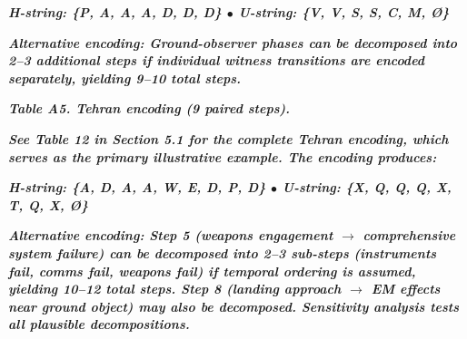\documentclass[11pt,letterpaper]{article}
\begin{document}
\begin{table}[H]
\centering
\small
{}
\end{table}


\textbf{\textit{H-string: \{P, A, A, A, D, D, D\}  $\bullet$  U-string: \{V, V, S, S, C, M, {\O}\}}}


\textbf{\textit{Alternative encoding: Ground-observer phases can be decomposed into 2--3 additional steps if individual witness transitions are encoded separately, yielding 9--10 total steps.}}


\textbf{\textit{Table A5. Tehran encoding (9 paired steps).}}


\textbf{\textit{See Table 12 in Section 5.1 for the complete Tehran encoding, which serves as the primary illustrative example. The encoding produces:}}


\textbf{\textit{H-string: \{A, D, A, A, W, E, D, P, D\}  $\bullet$  U-string: \{X, Q, Q, Q, X, T, Q, X, {\O}\}}}


\textbf{\textit{Alternative encoding: Step 5 (weapons engagement $\rightarrow$ comprehensive system failure) can be decomposed into 2--3 sub-steps (instruments fail, comms fail, weapons fail) if temporal ordering is assumed, yielding 10--12 total steps. Step 8 (landing approach $\rightarrow$ EM effects near ground object) may also be decomposed. Sensitivity analysis tests all plausible decompositions.}}
\end{document}
